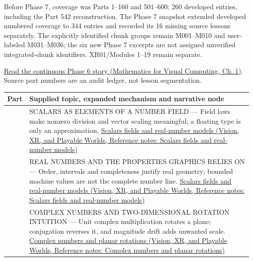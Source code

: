 Before Phase 7, coverage was Parts 1--160 and 501--600: 260 developed entries, including the Part 542 reconstruction. The Phase 7 snapshot extended developed numbered coverage to 344 entries and recorded its 16 missing source lessons separately. The explicitly identified chunk groups remain M001--M010 and user-labeled M031--M036; the six new Phase 7 excerpts are not assigned unverified integrated-chunk identifiers. XR01/Modules 1--19 remain separate.

\href{../02-Mathematics-for-Visual-Computing/main.pdf\#nameddest=01-foundations-i-ch017-the-panel-gives-us-a-reason-to-learn}{Read the continuous Phase 6 story (Mathematics for Visual Computing, Ch. 1)}. Source part numbers are an audit ledger, not lesson segmentation.

{\def\LTcaptype{none} %
\begin{longtable}[]{@{}
  >{\raggedright\arraybackslash}p{}
  >{\raggedright\arraybackslash}p{}@{}}
\toprule\noalign{}
\begin{minipage}[b]{\linewidth}\raggedright
Part
\end{minipage} & \begin{minipage}[b]{\linewidth}\raggedright
Supplied topic, expanded mechanism and narrative node
\end{minipage} \\
\midrule\noalign{}
\endhead
\bottomrule\noalign{}
\endlastfoot
501 & SCALARS AS ELEMENTS OF A NUMBER FIELD --- Field laws make nonzero division and vector scaling meaningful; a floating type is only an approximation. \href{../07-Vision-XR-and-Playable-Worlds/main.pdf\#nameddest=appendix-52051ad550fe}{Scalars fields and real-number models (Vision, XR, and Playable Worlds, Reference notes: Scalars fields and real-number models)} \\
502 & REAL NUMBERS AND THE PROPERTIES GRAPHICS RELIES ON --- Order, intervals and completeness justify real geometry; bounded machine values are not the complete number line. \href{../07-Vision-XR-and-Playable-Worlds/main.pdf\#nameddest=appendix-52051ad550fe}{Scalars fields and real-number models (Vision, XR, and Playable Worlds, Reference notes: Scalars fields and real-number models)} \\
503 & COMPLEX NUMBERS AND TWO-DIMENSIONAL ROTATION INTUITION --- Unit complex multiplication rotates a plane; conjugation reverses it, and magnitude drift adds unwanted scale. \href{../07-Vision-XR-and-Playable-Worlds/main.pdf\#nameddest=appendix-f77eadcc4a93}{Complex numbers and planar rotations (Vision, XR, and Playable Worlds, Reference notes: Complex numbers and planar rotations)} \\

\end{longtable}}
